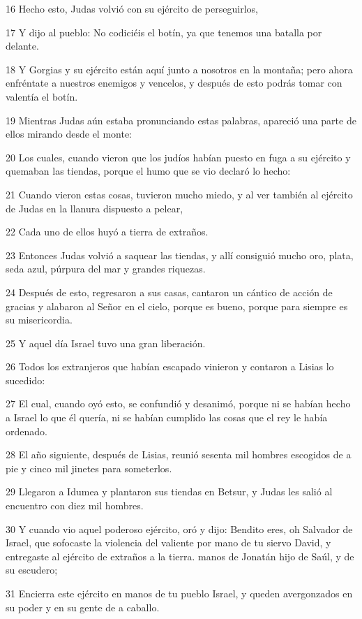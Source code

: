 \par 16 Hecho esto, Judas volvió con su ejército de perseguirlos,
\par 17 Y dijo al pueblo: No codiciéis el botín, ya que tenemos una batalla por delante.
\par 18 Y Gorgias y su ejército están aquí junto a nosotros en la montaña; pero ahora enfréntate a nuestros enemigos y vencelos, y después de esto podrás tomar con valentía el botín.
\par 19 Mientras Judas aún estaba pronunciando estas palabras, apareció una parte de ellos mirando desde el monte:
\par 20 Los cuales, cuando vieron que los judíos habían puesto en fuga a su ejército y quemaban las tiendas, porque el humo que se vio declaró lo hecho:
\par 21 Cuando vieron estas cosas, tuvieron mucho miedo, y al ver también al ejército de Judas en la llanura dispuesto a pelear,
\par 22 Cada uno de ellos huyó a tierra de extraños.
\par 23 Entonces Judas volvió a saquear las tiendas, y allí consiguió mucho oro, plata, seda azul, púrpura del mar y grandes riquezas.
\par 24 Después de esto, regresaron a sus casas, cantaron un cántico de acción de gracias y alabaron al Señor en el cielo, porque es bueno, porque para siempre es su misericordia.
\par 25 Y aquel día Israel tuvo una gran liberación.
\par 26 Todos los extranjeros que habían escapado vinieron y contaron a Lisias lo sucedido:
\par 27 El cual, cuando oyó esto, se confundió y desanimó, porque ni se habían hecho a Israel lo que él quería, ni se habían cumplido las cosas que el rey le había ordenado.
\par 28 El año siguiente, después de Lisias, reunió sesenta mil hombres escogidos de a pie y cinco mil jinetes para someterlos.
\par 29 Llegaron a Idumea y plantaron sus tiendas en Betsur, y Judas les salió al encuentro con diez mil hombres.
\par 30 Y cuando vio aquel poderoso ejército, oró y dijo: Bendito eres, oh Salvador de Israel, que sofocaste la violencia del valiente por mano de tu siervo David, y entregaste al ejército de extraños a la tierra. manos de Jonatán hijo de Saúl, y de su escudero;
\par 31 Encierra este ejército en manos de tu pueblo Israel, y queden avergonzados en su poder y en su gente de a caballo.
